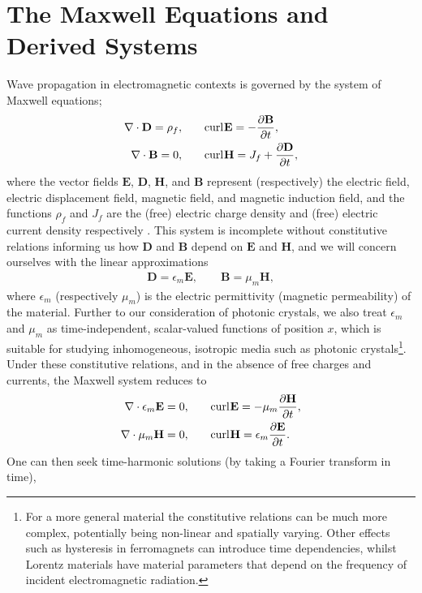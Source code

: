 \section{The Maxwell Equations and Derived Systems} \label{sec:Intro-Maxwell}
Wave propagation in electromagnetic contexts is governed by the system of Maxwell equations;
\begin{align*}
	\nabla\cdot \mathbf{D} = \rho_f, &\qquad
	\mathrm{curl}_{}\mathbf{E} = -\dfrac{\partial \mathbf{B}}{\partial t}, \\
	\nabla\cdot \mathbf{B} = 0, &\qquad
	 \mathrm{curl}_{}\mathbf{H} = J_f + \dfrac{\partial \mathbf{D}}{\partial t},
\end{align*}
where the vector fields $\mathbf{E}$, $\mathbf{D}$, $\mathbf{H}$, and $\mathbf{B}$ represent (respectively) the electric field, electric displacement field, magnetic field, and magnetic induction field, and the functions $\rho_f$ and $J_f$ are the (free) electric charge density and (free) electric current density respectively \cite{jackson1999classical, cessenat1996mathematical}.
This system is incomplete without constitutive relations informing us how $\mathbf{D}$ and $\mathbf{B}$ depend on $\mathbf{E}$ and $\mathbf{H}$, and we will concern ourselves with the linear approximations
\begin{align*}
	\mathbf{D} = \epsilon_m \mathbf{E}, \qquad \mathbf{B} = \mu_{m}\mathbf{H},
\end{align*}
where $\epsilon_m$ (respectively $\mu_m$) is the electric permittivity (magnetic permeability) of the material.
Further to our consideration of photonic crystals, we also treat $\epsilon_m$ and $\mu_m$ as time-independent, scalar-valued functions of position $x$, which is suitable for studying inhomogeneous, isotropic media such as photonic crystals\footnote{For a more general material the constitutive relations can be much more complex, potentially being non-linear and spatially varying. 
Other effects such as hysteresis in ferromagnets can introduce time dependencies, whilst Lorentz materials have material parameters that depend on the frequency of incident electromagnetic radiation.}.
Under these constitutive relations, and in the absence of free charges and currents, the Maxwell system reduces to
\begin{align*}
	\nabla\cdot \epsilon_m \mathbf{E} = 0, &\qquad
	\mathrm{curl}_{}\mathbf{E} = -\mu_m\dfrac{\partial \mathbf{H}}{\partial t}, \\
	\nabla\cdot \mu_m \mathbf{H} = 0, &\qquad
	\mathrm{curl}_{}\mathbf{H} = \epsilon_m \dfrac{\partial \mathbf{E}}{\partial t}.
\end{align*}
One can then seek time-harmonic solutions (by taking a Fourier transform in time), 
